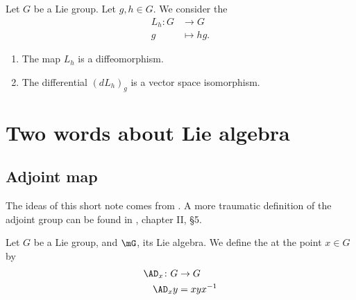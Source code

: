 \begin{lemma}       \label{LEMooPIUFooHjyXln}
	Let \( G\) be a Lie group. Let \( g,h\in G\). We consider the 
	\begin{equation}
		\begin{aligned}
			L_h\colon G & \to G       \\
			g           & \mapsto hg.
		\end{aligned}
	\end{equation}
	\begin{enumerate}
		\item
		      The map \( L_h\) is a diffeomorphism.
		\item
		      The differential \( (dL_h)_g\) is a vector space isomorphism.
	\end{enumerate}
\end{lemma}


\section{Two words about Lie algebra}


\subsection{Adjoint map}

The ideas of this short note comes from \cite{Lie}. A more traumatic definition of the adjoint group can be found in \cite{Helgason}, chapter II, \S 5.

\begin{definition}
	Let $G$ be a Lie group, and $\mG$, its Lie algebra. We define the  at the point $x\in G$ by
	\begin{equation}
		\begin{aligned}
			\AD_x\colon G & \to G     \\
			\AD_xy        & =xyx^{-1}
		\end{aligned}
	\end{equation}
\end{definition}

